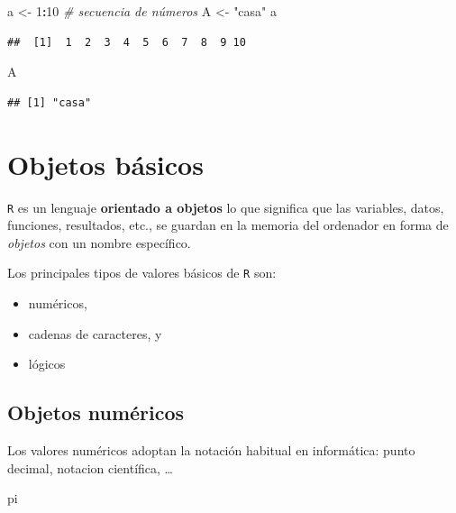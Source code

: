 \documentclass[]{book}
\newenvironment{Shaded}{\begin{snugshade}}{\end{snugshade}}
\newcommand{\CommentTok}[1]{\textcolor[rgb]{0.56,0.35,0.01}{\textit{#1}}}
\newcommand{\DecValTok}[1]{\textcolor[rgb]{0.00,0.00,0.81}{#1}}
\newcommand{\NormalTok}[1]{#1}
\newcommand{\OperatorTok}[1]{\textcolor[rgb]{0.81,0.36,0.00}{\textbf{#1}}}
\newcommand{\StringTok}[1]{\textcolor[rgb]{0.31,0.60,0.02}{#1}}
\begin{document}
\begin{Shaded}
\begin{Highlighting}[]
\NormalTok{a <-}\StringTok{ }\DecValTok{1}\OperatorTok{:}\DecValTok{10} \CommentTok{# secuencia de números}
\NormalTok{A <-}\StringTok{ "casa"}
\NormalTok{a}
\end{Highlighting}
\end{Shaded}

\begin{verbatim}
##  [1]  1  2  3  4  5  6  7  8  9 10
\end{verbatim}

\begin{Shaded}
\begin{Highlighting}[]
\NormalTok{A}
\end{Highlighting}
\end{Shaded}

\begin{verbatim}
## [1] "casa"
\end{verbatim}

\hypertarget{objetos-basicos}{%
\section{Objetos básicos}\label{objetos-basicos}}

\texttt{R} es un lenguaje \textbf{orientado a
objetos} lo que significa que las variables, datos, funciones,
resultados, etc., se guardan en la memoria del ordenador en forma de
\emph{objetos} con un nombre específico.

Los principales tipos de valores básicos de \texttt{R} son:

\begin{itemize}
\item
  numéricos,
\item
  cadenas de caracteres, y
\item
  lógicos
\end{itemize}

\hypertarget{objetos-numericos}{%
\subsection{Objetos numéricos}\label{objetos-numericos}}

Los valores numéricos adoptan
la notación habitual en informática: punto decimal, notacion científica, \ldots{}

\begin{Shaded}
\begin{Highlighting}[]
\NormalTok{pi}
\end{Highlighting}
\end{Shaded}
\end{document}
